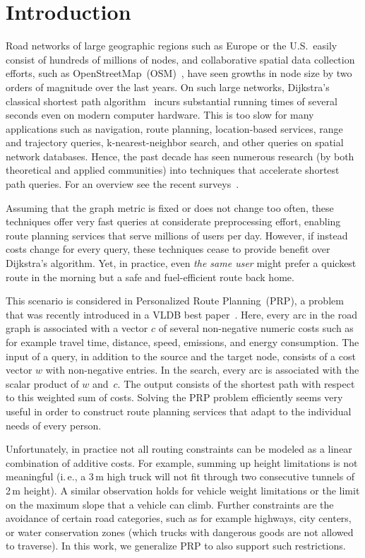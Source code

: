\documentclass{sig-alternate}
\newcommand{\ie}{i.\,e.\xspace}
\newcommand{\arccost}{\ensuremath{c}}
\newcommand{\queryweight}{\ensuremath{w}}
\begin{document}
\section{Introduction}

Road networks of large geographic regions such as Europe or the U.S.\
easily consist of hundreds of millions of nodes, and collaborative spatial
data collection efforts, such as OpenStreetMap~(OSM)~\cite{osm},
have seen growths in node size by two orders of magnitude over the
last years. On such large networks, Dijkstra's classical shortest
path algorithm~\cite{d-ntpcg-59} incurs substantial running times
of several seconds even on modern computer hardware. This is too slow
for many applications such as navigation, route planning, location-based
services, range and trajectory queries, k-nearest-neighbor search,
and other queries on spatial network databases. Hence, the past decade
has seen numerous research (by both theoretical and applied
communities) into techniques that accelerate shortest path queries.
For an overview see the recent surveys~\cite{bdgmpsww-rptn-14,s-spqsn-14}. 

Assuming that the graph metric is fixed or does not change too often, these techniques offer very fast queries at  considerate preprocessing effort, enabling route planning services that serve millions of users per day. 
However, if instead costs change for every query, these techniques cease to provide benefit over Dijkstra's algorithm. 
Yet, in practice, even \emph{the same user} might prefer a quickest route in the morning but a safe and fuel-efficient route back home.

This scenario is considered in Personalized Route Planning~(PRP), a problem that was recently
introduced in a VLDB best paper~\cite{fns-opca-14}. Here, every
arc in the road graph is associated with a vector $\arccost$ of several
non-negative numeric costs such as for example travel time, distance, speed,
emissions, and energy consumption. The input of a query, in addition
to the source and the target node, consists of a cost vector $\queryweight$ with non-negative
entries. In the search, every arc is associated with the scalar
product of $\queryweight$ and~$\arccost$. The output consists of the shortest path 
with respect to this weighted sum of costs. Solving the PRP problem efficiently seems very
useful in order to construct route planning services that adapt
to the individual needs of every person. 

Unfortunately, in practice not all routing constraints can be modeled as a linear combination of additive costs. 
For example, summing up height limitations is not meaningful (\ie, a 3\,m high truck will not fit through two consecutive tunnels of 2\,m height).
A similar observation holds for vehicle weight limitations or the limit on the maximum slope that a vehicle can climb. 
Further constraints are
the avoidance of certain road categories, such as for example highways, city centers, or water conservation zones (which trucks with dangerous goods are not allowed to traverse).
In this work, we generalize PRP to also support such restrictions.
\end{document}

